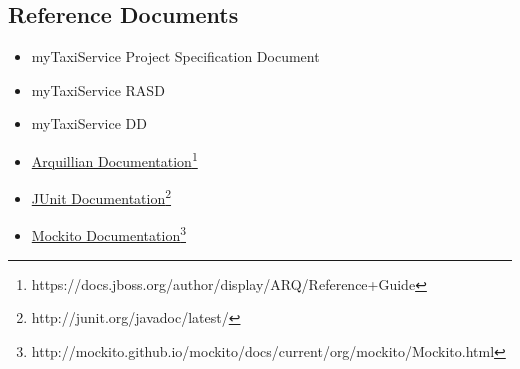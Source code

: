 \subsection{Reference Documents}
\begin{itemize}
	\item myTaxiService Project Specification Document
	\item myTaxiService RASD
	\item myTaxiService DD
	\item \href{https://docs.jboss.org/author/display/ARQ/Reference+Guide}{Arquillian Documentation}\footnote{https://docs.jboss.org/author/display/ARQ/Reference+Guide}
	\item \href{http://junit.org/javadoc/latest/}{JUnit Documentation}\footnote{http://junit.org/javadoc/latest/}
	\item \href{http://mockito.github.io/mockito/docs/current/org/mockito/Mockito.html}{Mockito Documentation}\footnote{http://mockito.github.io/mockito/docs/current/org/mockito/Mockito.html}
\end{itemize}